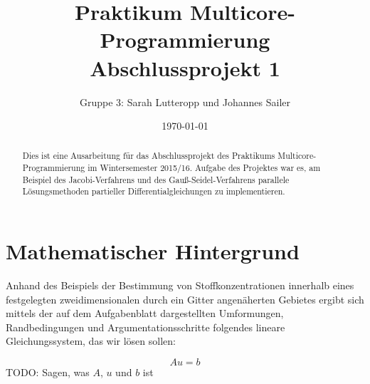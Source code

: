 \documentclass{article}
\title{Praktikum Multicore-Programmierung \\ Abschlussprojekt 1}
\author{Gruppe 3: Sarah Lutteropp und Johannes Sailer}
\date{\today}
\begin{document}
\maketitle


\begin{abstract}
Dies ist eine Ausarbeitung für das Abschlussprojekt des Praktikums Multicore-Programmierung im Wintersemester 2015/16. Aufgabe des Projektes war es, am Beispiel des Jacobi-Verfahrens und des Gauß-Seidel-Verfahrens parallele Lösungsmethoden partieller Differentialgleichungen zu implementieren.
\end{abstract}

\section{Mathematischer Hintergrund}

%	

Anhand des Beispiels der Bestimmung von Stoffkonzentrationen innerhalb eines festgelegten zweidimensionalen durch ein Gitter angenäherten Gebietes ergibt sich mittels der auf dem Aufgabenblatt dargestellten Umformungen, Randbedingungen und Argumentationsschritte folgendes lineare Gleichungssystem, das wir lösen sollen:

$$Au = b$$ TODO: Sagen, was $A$, $u$ und $b$ ist
\end{document}
